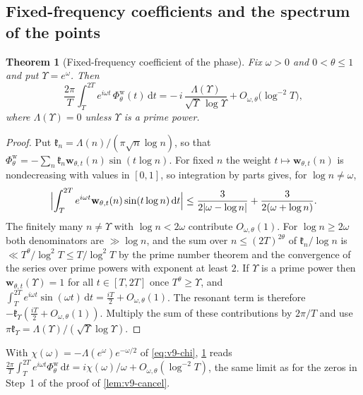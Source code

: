 \documentclass[11pt,a4paper]{article}
\numberwithin{equation}{section}
\newtheorem{theorem}{Theorem}[section]
\theoremstyle{definition}
\theoremstyle{remark}
\newcommand{\dd}{\,\mathrm dt}
\begin{document}
\subsection{Fixed-frequency coefficients and the spectrum of the points}\label{sec:taucw-spec}
\begin{theorem}[Fixed-frequency coefficient of the phase]\label{thm:taucw-coef}
Fix $\omega>0$ and $0<\theta\le1$ and put $\Upsilon=e^\omega$. Then
\begin{equation}\label{eq:taucw-coef}
\frac{2\pi}T\int_T^{2T}e^{i\omega t}\,\Phi^{\mathrm w}_\theta(t)\dd=-\,i\,\frac{\Lambda(\Upsilon)}{\sqrt\Upsilon\,\log\Upsilon}+O_{\omega,\theta}\bigl(\log^{-2}T\bigr),
\end{equation}
where $\Lambda(\Upsilon)=0$ unless $\Upsilon$ is a prime power.
\end{theorem}
\begin{proof}
Put $\mathfrak k_n=\Lambda(n)/(\pi\sqrt n\log n)$, so that $\Phi^{\mathrm w}_\theta=-\sum_n\mathfrak k_n\mathbf w_{\theta,t}(n)\sin(t\log n)$. For fixed $n$ the weight $t\mapsto\mathbf w_{\theta,t}(n)$ is nondecreasing with values in $[0,1]$, so integration by parts gives, for $\log n\ne\omega$,
\begin{equation}
\Bigl|\int_T^{2T}e^{i\omega t}\mathbf w_{\theta,t}(n)\sin(t\log n)\dd\Bigr|\le\frac3{2|\omega-\log n|}+\frac3{2(\omega+\log n)}.
\end{equation}
The finitely many $n\ne\Upsilon$ with $\log n<2\omega$ contribute $O_{\omega,\theta}(1)$. For $\log n\ge2\omega$ both denominators are $\gg\log n$, and the sum over $n\le(2T)^{2\theta}$ of $\mathfrak k_n/\log n$ is $\ll T^\theta/\log^2T\le T/\log^2T$ by the prime number theorem and the convergence of the series over prime powers with exponent at least $2$. If $\Upsilon$ is a prime power then $\mathbf w_{\theta,t}(\Upsilon)=1$ for all $t\in[T,2T]$ once $T^\theta\ge\Upsilon$, and $\int_T^{2T}e^{i\omega t}\sin(\omega t)\dd=\frac{iT}2+O_{\omega,\theta}(1)$. The resonant term is therefore $-\mathfrak k_\Upsilon(\frac{iT}2+O_{\omega,\theta}(1))$. Multiply the sum of these contributions by $2\pi/T$ and use $\pi\mathfrak k_\Upsilon=\Lambda(\Upsilon)/(\sqrt\Upsilon\log\Upsilon)$.
\end{proof}

With $\chi(\omega)=-\Lambda(e^\omega)e^{-\omega/2}$ of \eqref{eq:v9-chi}, \cref{thm:taucw-coef} reads $\frac{2\pi}T\int_T^{2T}e^{i\omega t}\Phi^{\mathrm w}_\theta\dd=i\chi(\omega)/\omega+O_{\omega,\theta}(\log^{-2}T)$, the same limit as for the zeros in Step~1 of the proof of \cref{lem:v9-cancel}.
\end{document}

